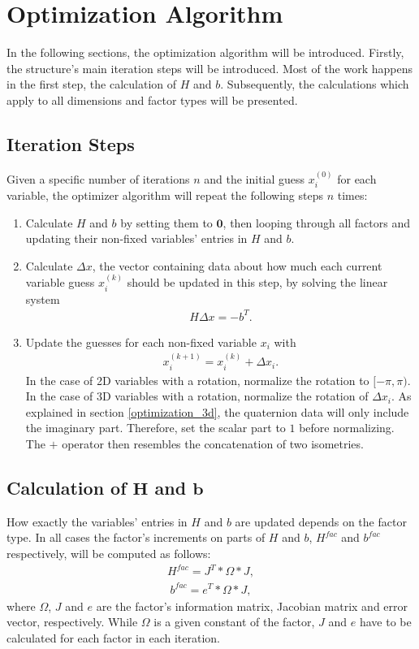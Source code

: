 \section{Optimization Algorithm}
In the following sections, the optimization algorithm will be introduced. Firstly, the structure's main iteration steps will be introduced. Most of the work happens in the first step, the calculation of $H$ and $b$. Subsequently, the calculations which apply to all dimensions and factor types will be presented.



\subsection{Iteration Steps}
Given a specific number of iterations $n$ and the initial guess $x_i^{(0)}$ for each variable, the optimizer algorithm will repeat the following steps $n$ times:
\begin{enumerate}
	\item Calculate $H$ and $b$ by setting them to $\boldsymbol{0}$, then looping through all factors and updating their non-fixed variables' entries in $H$ and $b$.
	\item Calculate $\Delta x$, the vector containing data about how much each current variable guess $x_i^{(k)}$ should be updated in this step, by solving the linear system
		\begin{align}
			H \Delta x = -b^T.
		\end{align}
	\item Update the guesses for each non-fixed variable $x_i$ with
		\begin{align}
			x_i^{(k+1)} = x_i^{(k)} + \Delta x_i.
		\end{align}
		In the case of 2D variables with a rotation, normalize the rotation to $[-\pi, \pi)$.
		In the case of 3D variables with a rotation, normalize the rotation of $\Delta x_i$. As explained in section \ref{optimization_3d}, the quaternion data will only include the imaginary part. Therefore, set the scalar part to $1$ before normalizing. The $+$ operator then resembles the concatenation of two isometries.
\end{enumerate}



\subsection{Calculation of $\boldsymbol{H}$ and $\boldsymbol{b}$}
How exactly the variables' entries in $H$ and $b$ are updated depends on the factor type. In all cases the factor's increments on parts of $H$ and $b$, $H^{fac}$ and $b^{fac}$ respectively, will be computed as follows:
\begin{align}
H^{fac} = J^T * \Omega * J,
\end{align}
\begin{align}
b^{fac} = e^T * \Omega * J,
\end{align}
where $\Omega$, $J$ and $e$ are the factor's information matrix, Jacobian matrix and error vector, respectively. While $\Omega$ is a given constant of the factor, $J$ and $e$ have to be calculated for each factor in each iteration.

